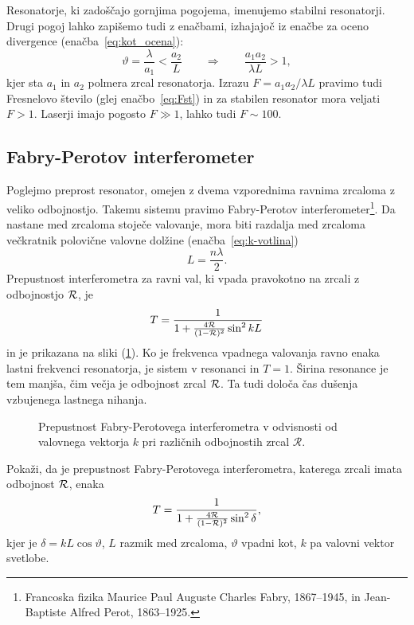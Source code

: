 Resonatorje, ki zadoščajo gornjima pogojema, imenujemo stabilni 
resonatorji.
Drugi pogoj lahko zapišemo tudi z enačbami, izhajajoč iz enačbe za oceno divergence (enačba~\ref{eq:kot_ocena}):
\begin{equation}
\vartheta = \frac{\lambda}{a_1} < \frac{a_2}{L} \qquad \Rightarrow \qquad
\frac{a_{1}a_{2}}{\lambda L}>1,
\label{eq:Fresnelovo_stevilo}
\end{equation}
kjer sta $a_{1}$ in $a_{2}$ polmera zrcal resonatorja. Izrazu 
$
F = a_{1}a_{2}/\lambda L
$
pravimo tudi Fresnelovo število (glej enačbo~\ref{eq:Fst})
in za stabilen resonator mora veljati $F>1$. Laserji imajo pogosto $F\gg 1$, lahko tudi $F \sim 100$.

\subsection*{Fabry-Perotov interferometer}
Poglejmo preprost resonator, omejen z dvema vzporednima ravnima zrcaloma
z veliko odbojnostjo. Takemu sistemu pravimo Fabry-Perotov 
interferometer\footnote{Francoska fizika Maurice Paul Auguste Charles Fabry, 1867--1945, in 
Jean-Baptiste Alfred Perot, 1863--1925.}. 
Da nastane med zrcaloma stoječe valovanje, mora biti razdalja 
med zrcaloma večkratnik polovične valovne dolžine (enačba~\ref{eq:k-votlina})
\begin{equation}
L = \frac{n \lambda}{2}.
\end{equation}
Prepustnost interferometra za ravni val, ki vpada pravokotno na zrcali z
odbojnostjo ${\cal R}$, je 
\begin{equation}
T=\frac{1}{1+\frac{4{\cal R}}{(1-{\cal R})^{2}}\sin^{2}kL}
\label{eq:Fabry-Perot-prepustnost}
\end{equation}
in je prikazana na sliki (\ref{fig:Fabry-Perot}).
Ko je frekvenca vpadnega valovanja ravno enaka lastni frekvenci
resonatorja, je sistem v resonanci in  $T=1$. Širina resonance je tem manjša, čim
večja je odbojnost zrcal ${\cal R}$. Ta tudi določa čas dušenja vzbujenega
lastnega nihanja.
\begin{figure}[h!]
\centering
\def\svgwidth{85truemm} 

\caption{
Prepustnost Fabry-Perotovega interferometra
v odvisnosti od valovnega vektorja $k$ pri različnih odbojnostih zrcal
$\mathcal{R}.$}
\label{fig:Fabry-Perot}
\end{figure}

\begin{definition}
Pokaži, da je prepustnost Fabry-Perotovega interferometra, katerega zrcali imata odbojnost $\cal{R}$, enaka 
\begin{equation}
T = \frac{1}{1+\frac{4\cal{R}}{(1-{\cal R})^2}\sin^2 \delta},
\end{equation}
kjer je $\delta = kL\cos{\vartheta}$, $L$ razmik med zrcaloma, $\vartheta$ vpadni kot, 
$k$ pa valovni vektor svetlobe.
\end{definition}

